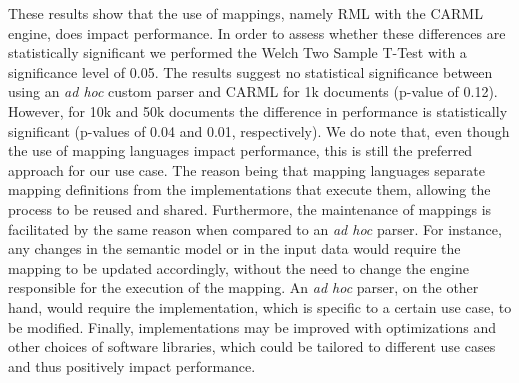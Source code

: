 \documentclass[runningheads]{llncs}
\begin{document}

These results show that the use of mappings, namely RML with the CARML engine, does impact performance. In order to assess whether these differences are statistically significant we performed the Welch Two Sample T-Test with a significance level of 0.05. The results suggest no statistical significance between using an \textit{ad hoc} custom parser and CARML for 1k documents (p-value of 0.12). However, for 10k and 50k documents the difference in performance is statistically significant (p-values of 0.04 and 0.01, respectively). We do note that, even though the use of mapping languages impact performance, this is still the preferred approach for our use case. The reason being that mapping languages separate mapping definitions from the implementations that execute them, allowing the process to be reused and shared. Furthermore, the maintenance of mappings is facilitated by the same reason when compared to an \textit{ad hoc} parser. For instance, any changes in the semantic model or in the input data would require the mapping to be updated accordingly, without the need to change the engine responsible for the execution of the mapping. An \textit{ad hoc} parser, on the other hand, would require the implementation, which is specific to a certain use case, to be modified. Finally, implementations may be improved with optimizations and other choices of software libraries, which could be tailored to different use cases and thus positively impact performance.
\end{document}
